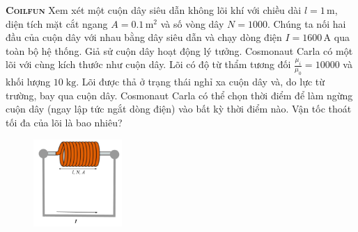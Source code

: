 \begin{problem}{\textbf{\textsc{Coilfun}}}
Xem xét một cuộn dây siêu dẫn không lõi khí với chiều dài \( l = 1 \, \text{m} \), diện tích mặt cắt ngang \( A = 0.1 \, \text{m}^2 \) và số vòng dây \( N = 1000 \). Chúng ta nối hai đầu của cuộn dây với nhau bằng dây siêu dẫn và chạy dòng điện \( I = 1600 \, \text{A} \) qua toàn bộ hệ thống. Giả sử cuộn dây hoạt động lý tưởng.
\newline
\newline
Cosmonaut Carla có một lõi với cùng kích thước như cuộn dây. Lõi có độ từ thẩm tương đối $\frac{\mu_i}{\mu_0} = 10000$ và khối lượng $10\;\mathrm{kg}$. Lõi được thả ở trạng thái nghỉ xa cuộn dây và, do lực từ trường, bay qua cuộn dây. Cosmonaut Carla có thể chọn thời điểm để làm ngừng cuộn dây (ngay lập tức ngắt dòng điện) vào bất kỳ thời điểm nào. Vận tốc thoát tối đa của lõi là bao nhiêu?   


\FloatBarrier
\begin{figure}[!htbp]
\centering
\includegraphics[width=0.3\textwidth]{problems/figures/coilfun.png}
\end{figure}
\FloatBarrier

\end{problem}